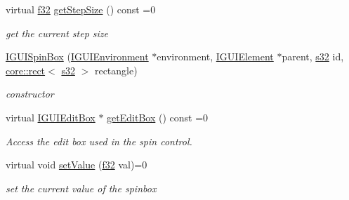 \begin{DoxyCompactItemize}
\mbox{\label{classirr_1_1gui_1_1IGUISpinBox_a5c66183b25860667488ff6c97df241bd}} 
virtual \hyperlink{namespaceirr_a0277be98d67dc26ff93b1a6a1d086b07}{f32} \hyperlink{classirr_1_1gui_1_1IGUISpinBox_a5c66183b25860667488ff6c97df241bd}{get\+Step\+Size} () const =0
\begin{DoxyCompactList}\small\item\em get the current step size \end{DoxyCompactList}\item 
\mbox{\label{classirr_1_1gui_1_1IGUISpinBox_a9e9c785f73b8fadbaff330f1cbb61adf}} 
\hyperlink{classirr_1_1gui_1_1IGUISpinBox_a9e9c785f73b8fadbaff330f1cbb61adf}{I\+G\+U\+I\+Spin\+Box} (\hyperlink{classirr_1_1gui_1_1IGUIEnvironment}{I\+G\+U\+I\+Environment} $\ast$environment, \hyperlink{classirr_1_1gui_1_1IGUIElement}{I\+G\+U\+I\+Element} $\ast$parent, \hyperlink{namespaceirr_ac66849b7a6ed16e30ebede579f9b47c6}{s32} id, \hyperlink{classirr_1_1core_1_1rect}{core\+::rect}$<$ \hyperlink{namespaceirr_ac66849b7a6ed16e30ebede579f9b47c6}{s32} $>$ rectangle)
\begin{DoxyCompactList}\small\item\em constructor \end{DoxyCompactList}\item 
\mbox{\label{classirr_1_1gui_1_1IGUISpinBox_a04bd863724a7b37b97e7f9368fda77ef}} 
virtual \hyperlink{classirr_1_1gui_1_1IGUIEditBox}{I\+G\+U\+I\+Edit\+Box} $\ast$ \hyperlink{classirr_1_1gui_1_1IGUISpinBox_a04bd863724a7b37b97e7f9368fda77ef}{get\+Edit\+Box} () const =0
\begin{DoxyCompactList}\small\item\em Access the edit box used in the spin control. \end{DoxyCompactList}\item 
virtual void \hyperlink{classirr_1_1gui_1_1IGUISpinBox_a28e388e3767d4257f712d899c744bc20}{set\+Value} (\hyperlink{namespaceirr_a0277be98d67dc26ff93b1a6a1d086b07}{f32} val)=0
\begin{DoxyCompactList}\small\item\em set the current value of the spinbox \end{DoxyCompactList}\item 
\mbox{\label{classirr_1_1gui_1_1IGUISpinBox_acfb0ebe7ab30b58e9d34b7925e785bb8}} 

\end{DoxyCompactItemize}
